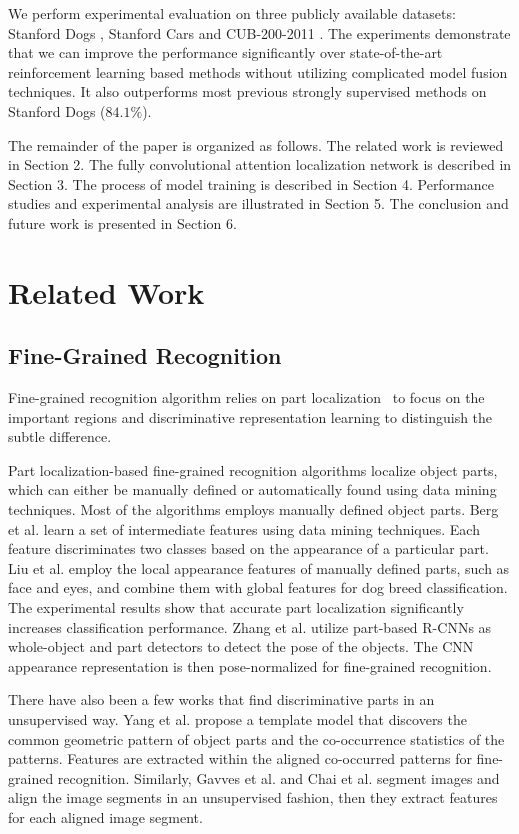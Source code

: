 \documentclass[10pt,twocolumn,letterpaper]{article}
\begin{document}
We perform experimental evaluation on three publicly available datasets: Stanford Dogs \cite{bd4}, Stanford Cars \cite{bd5} and CUB-200-2011 \cite{bd6}.
The experiments demonstrate that we can improve the performance significantly over state-of-the-art reinforcement learning based methods without utilizing complicated model fusion techniques.
It also outperforms most previous strongly supervised methods on Stanford Dogs ($84.1\%$).

The remainder of the paper is organized as follows. The related work is reviewed in Section 2.
The fully convolutional attention localization network is described in Section 3.
The process of model training is described in Section 4.
Performance studies and experimental analysis are illustrated in Section 5.
The conclusion and future work is presented in Section 6.

\section{Related Work}
\subsection{Fine-Grained Recognition}
Fine-grained recognition algorithm relies on part localization~\cite{bd9,bd10,bd11,bd12,bd13,bd14} to focus on the important regions and discriminative representation learning to distinguish the subtle difference.

Part localization-based fine-grained recognition algorithms localize object parts, which can either be manually defined or automatically found using data mining techniques.
Most of the algorithms employs manually defined object parts.
Berg et al. \cite{bd9} learn a set of intermediate features using data mining techniques.
Each feature discriminates two classes based on the appearance of a particular part.
Liu et al. \cite{bd10} employ the local appearance features of manually defined parts, such as face and eyes, and combine them with global features for dog breed classification.
The experimental results show that accurate part localization significantly increases classification performance.
Zhang et al. \cite{bd11} utilize part-based R-CNNs as whole-object and part detectors to detect the pose of the objects.  The CNN appearance representation is then pose-normalized for fine-grained recognition.

There have also been a few works that find discriminative parts in an unsupervised way.
Yang et al. \cite{bd12} propose a template model that discovers the common geometric pattern of object parts and the co-occurrence statistics of the patterns.
Features are extracted within the aligned co-occurred patterns for fine-grained recognition.
Similarly, Gavves et al. \cite{bd13} and Chai et al. \cite{bd14} segment images and align the image segments in an unsupervised fashion, then they extract features for each aligned image segment.
\end{document}
